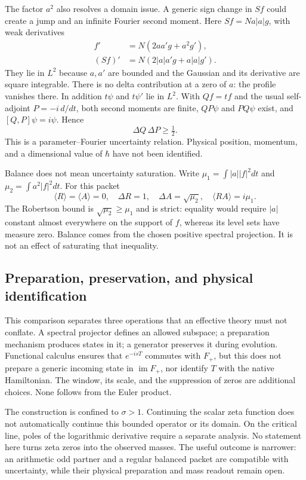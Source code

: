 The factor $a^2$ also resolves a domain issue. A generic sign change
in $Sf$ could create a jump and an infinite Fourier second moment.
Here $Sf=Na|a|g$, with weak derivatives
\begin{align}
 f'&=N(2aa'g+a^2g'),\\
 (Sf)'&=N(2|a|a'g+a|a|g').
\end{align}
They lie in $L^2$ because $a,a'$ are bounded and the Gaussian and its
derivative are square integrable. There is no delta contribution at a
zero of $a$: the profile vanishes there. In addition $t\psi$ and
$t\psi'$ lie in $L^2$. With $Qf=tf$ and the usual self-adjoint
$P=-i\,d/dt$, both second moments are finite, $QP\psi$ and
$PQ\psi$ exist, and $[Q,P]\psi=i\psi$. Hence
\begin{equation}
 \Delta Q\,\Delta P\geq\tfrac12.
\end{equation}
This is a parameter--Fourier uncertainty relation. Physical position,
momentum, and a dimensional value of $\hbar$ have not been identified.

Balance does not mean uncertainty saturation. Write
$\mu_1=\int |a||f|^2dt$ and $\mu_2=\int a^2|f|^2dt$. For this packet
\begin{equation}
 \langle R\rangle=\langle A\rangle=0,\quad
 \Delta R=1,\quad \Delta A=\sqrt{\mu_2},\quad
 \langle RA\rangle=i\mu_1.
\end{equation}
The Robertson bound is $\sqrt{\mu_2}\geq\mu_1$ and is strict:
equality would require $|a|$ constant almost everywhere on the
support of $f$, whereas its level sets have measure zero. Balance
comes from the chosen positive spectral projection. It is not an
effect of saturating that inequality.

\subsection{Preparation, preservation, and physical identification}

This comparison separates three operations that an effective theory
must not conflate. A spectral projector defines an allowed subspace;
a preparation mechanism produces states in it; a generator preserves
it during evolution. Functional calculus ensures that $e^{-isT}$
commutes with $F_+$, but this does not prepare a generic incoming
state in $\operatorname{im}F_+$, nor identify $T$ with the native
Hamiltonian. The window, its scale, and the suppression of zeros
are additional choices. None follows from the Euler product.

The construction is confined to $\sigma>1$. Continuing the scalar
zeta function does not automatically continue this bounded operator
or its domain. On the critical line, poles of the logarithmic
derivative require a separate analysis. No statement here turns
zeta zeros into the observed masses.
The useful outcome is narrower: an arithmetic odd partner and a
regular balanced packet are compatible with uncertainty, while
their physical preparation and mass readout remain open.

